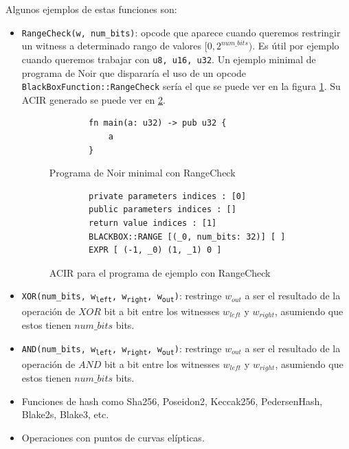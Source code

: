 Algunos ejemplos de estas funciones son:
\begin{itemize}
    \item \texttt{RangeCheck(w, num\_bits)}: opcode que aparece cuando queremos restringir un witness a determinado rango de valores $[0,2^{num\_bits})$. Es útil por ejemplo cuando queremos trabajar con \texttt{u8, u16, u32}. Un ejemplo minimal de programa de Noir que dispararía el uso de un opcode \texttt{BlackBoxFunction::RangeCheck} sería el que se puede ver en la figura \ref{fig:noir_ejemplo_range}. Su ACIR generado se puede ver en \ref{fig:ACIR_ejemplo_range}.
    \begin{figure}[h!]
        \centering
        \begin{verbatim}
        fn main(a: u32) -> pub u32 {
            a
        }
        \end{verbatim}
        \caption{Programa de Noir minimal con RangeCheck}
        \label{fig:noir_ejemplo_range}
    \end{figure}
    \begin{figure}[h!]
        \centering
        \begin{verbatim}
        private parameters indices : [0]
        public parameters indices : []
        return value indices : [1]
        BLACKBOX::RANGE [(_0, num_bits: 32)] [ ]
        EXPR [ (-1, _0) (1, _1) 0 ]
        \end{verbatim}
        \caption{ACIR para el programa de ejemplo con RangeCheck}
        \label{fig:ACIR_ejemplo_range}
    \end{figure}

    \item \texttt{XOR(num\_bits, w\textsubscript{left}, w\textsubscript{right}, w\textsubscript{out})}: restringe $w_{out}$ a ser el resultado de la operación de $XOR$ bit a bit entre los witnesses $w_{left}$ y $w_{right}$, asumiendo que estos tienen $num\_bits$ bits.
    
    \item \texttt{AND(num\_bits, w\textsubscript{left}, w\textsubscript{right}, w\textsubscript{out})}: restringe $w_{out}$ a ser el resultado de la operación de $AND$ bit a bit entre los witnesses $w_{left}$ y $w_{right}$, asumiendo que estos tienen $num\_bits$ bits.

    \item Funciones de hash como Sha256, Poseidon2, Keccak256, PedersenHash, Blake2s, Blake3, etc.

    \item Operaciones con puntos de curvas elípticas.
    
\end{itemize}


